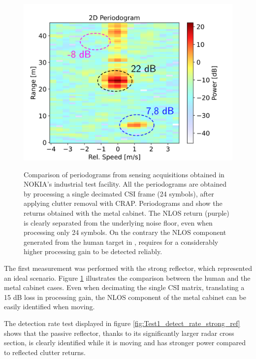 \begin{figure}[H]
{		\includegraphics[scale=0.45]{Images/Test1/per_strong_ref/db_1frame_dec_CRAP_HUMAN_labelled_text22.png}
	}
	\caption[]{\small Comparison of periodograms from sensing acquisitions obtained in NOKIA's industrial test facility.
		All the periodograms are obtained by processing a single decimated CSI frame (24 symbols), after applying clutter removal with CRAP.
		Periodograms  and  show the returns obtained with the metal cabinet. The NLOS return (purple) is clearly separated from the underlying noise floor, even when processing only 24 symbols. On the contrary the NLOS component generated from the human target in , requires for a considerably higher processing gain to be detected reliably.}
	\label{fig:Test1_metal-human_comparison}
	\end{figure}
	
The first measurement was performed with the strong reflector, which represented an ideal scenario. 
Figure \ref{fig:Test1_metal-human_comparison} illustrates the comparison between the human and the metal cabinet cases. 
Even when decimating the single CSI matrix, translating a 15 dB loss in processing gain, the NLOS component of the metal cabinet can be easily identified when moving.

The detection rate test displayed in figure \ref{fig:Test1_detect_rate_strong_ref} shows that the passive reflector, thanks to its significantly larger radar cross section, is clearly identified while it is moving and has stronger power compared to reflected clutter returns.

